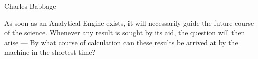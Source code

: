 \begin{frame}[shrink=10]{Charles Babbage}

\vspace{-9pt}
\begin{myboxtitle}
As soon as an Analytical Engine exists, it will necessarily guide the future
course of the science. Whenever any result is sought by its aid, the question
will then arise --- \alert{By what course of calculation can these results be arrived at
by the machine in the shortest time?}
\end{myboxtitle}

\vspace{-12pt}

\end{frame}

